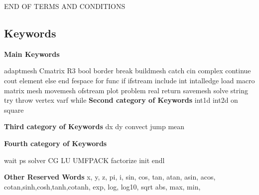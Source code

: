 \documentclass[a4paper,twoside,12pt]{book}
\begin{document}
		     END OF TERMS AND CONDITIONS


\begin{twocolumn}

\section{Keywords}\label{keywrds}

 \textbf{Main Keywords}

\bFF
adaptmesh
Cmatrix
R3
bool
border
break
buildmesh
catch
cin
complex
continue
cout
element
else
end
fespace
for
func
if
ifstream
include
int
intalledge
load
macro
matrix
mesh
movemesh
ofstream
plot
problem
real
return
savemesh
solve
string
try
throw
vertex
varf
while
\eFF
\textbf{Second category of Keywords}
\bFF
int1d
int2d
on
square
\eFF

\textbf{Third category of Keywords}
\bFF
dx
dy
convect
jump
mean

\eFF

\textbf{Fourth category of Keywords}
\bFF

wait
ps
solver
CG
LU
UMFPACK
factorize
init
endl

\eFF
\textbf{Other Reserved Words}
\bFF
x, y, z, pi, i,
sin, cos, tan, atan, asin, acos,
cotan,sinh,cosh,tanh,cotanh,
exp, log, log10, sqrt
abs, max, min,

\eFF
\end{twocolumn}
\onecolumn
\newpage
\end{document}

